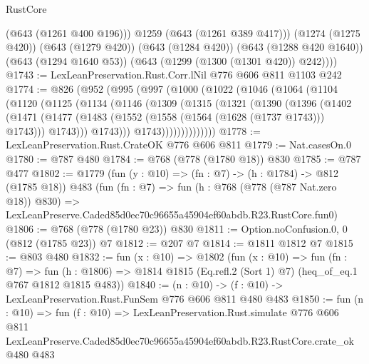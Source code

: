 \begin{lexlean}{RustCore}
\begin{coremodule}
            (@643 (@1261 @400 @196)))
          @1259
          (@643 (@1261 @389 @417)))
        (@1274 (@1275 @420))
        (@643 (@1279 @420))
        (@643 (@1284 @420))
        (@643 (@1288 @420 @1640))
        (@643 (@1294 @1640 @53))
        (@643 (@1299 (@1300 (@1301 @420)) @242))))
@1743 := LexLeanPreservation.Rust.Corr.lNil @776 @606 @811 @1103 @242
@1774 := @826
    (@952
      (@995
        (@997
          (@1000
            (@1022
              (@1046
                (@1064
                  (@1104
                    (@1120
                      (@1125
                        (@1134
                          (@1146
                            (@1309
                              (@1315
                                (@1321
                                  (@1390
                                    (@1396
                                      (@1402
                                        (@1471
                                          (@1477
                                            (@1483
                                              (@1552 (@1558 (@1564 (@1628 (@1737 @1743))) @1743)))
                                            @1743)))
                                      @1743)))
                                @1743))))))))))))))
@1778 := LexLeanPreservation.Rust.CrateOK @776 @606 @811
@1779 := Nat.casesOn.{0}
@1780 := @787 @480
@1784 := @768 (@778 (@1780 @18)) @830
@1785 := @787 @477
@1802 := @1779
    (fun (y : @10) => (fn : @7) -> (h : @1784) -> @812 (@1785 @18))
    @483
    (fun (fn : @7) =>
    fun (h : @768 (@778 (@787 Nat.zero @18)) @830) =>
    LexLeanPreserve.Caded85d0ec70c96655a45904ef60abdb.R23.RustCore.fun0)
@1806 := @768 (@778 (@1780 @23)) @830
@1811 := Option.noConfusion.{0, 0} (@812 (@1785 @23)) @7
@1812 := @207 @7
@1814 := @1811 @1812 @7
@1815 := @803 @480
@1832 := fun (x : @10) =>
  @1802
    (fun (x : @10) =>
    fun (fn : @7) =>
    fun (h : @1806) => @1814 @1815 (Eq.refl.{2} (Sort 1) @7) (heq_of_eq.{1} @767 @1812 @1815 @483))
@1840 := (n : @10) -> (f : @10) -> LexLeanPreservation.Rust.FunSem @776 @606 @811 @480 @483
@1850 := fun (n : @10) =>
  fun (f : @10) =>
  LexLeanPreservation.Rust.simulate
    @776
    @606
    @811
    LexLeanPreserve.Caded85d0ec70c96655a45904ef60abdb.R23.RustCore.crate_ok
    @480
    @483
\end{coremodule}
\end{lexlean}
